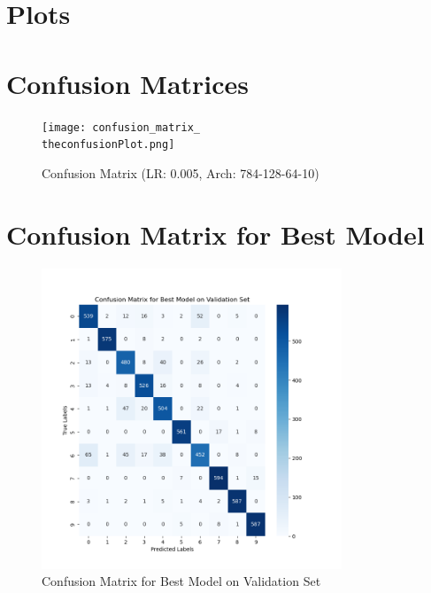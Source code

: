 \documentclass{article}
\begin{document}
\newpage
\section{Plots}

\section{Confusion Matrices}

\setcounter{confusionPlot}{0}


\begin{figure}[h!]
    \centering
    \addtocounter{confusionPlot}{1}
    \texttt{[image: confusion\_matrix\_\\theconfusionPlot.png]}
    \caption{Confusion Matrix (LR: 0.005, Arch: 784-128-64-10)}
\end{figure}

\section{Confusion Matrix for Best Model}

\begin{figure}[h!]
    \centering
    \includegraphics[width=0.8\textwidth]{confusion_matrix_best_model.png}
    \caption{Confusion Matrix for Best Model on Validation Set}
\end{figure}


\end{document}
